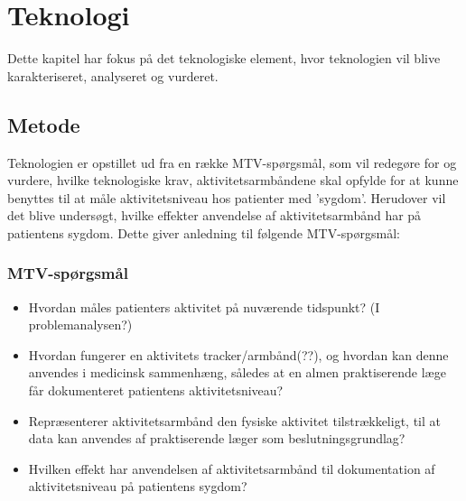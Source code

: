 \chapter{Teknologi}
Dette kapitel har fokus på det teknologiske element, hvor teknologien vil blive karakteriseret, analyseret og vurderet.
\section{Metode}
Teknologien er opstillet ud fra en række MTV-spørgsmål, som vil redegøre for og vurdere, hvilke teknologiske krav, aktivitetsarmbåndene skal opfylde for at kunne benyttes til at måle aktivitetsniveau hos patienter med ’sygdom’. Herudover vil det blive undersøgt, hvilke effekter anvendelse af aktivitetsarmbånd har på patientens sygdom. Dette giver anledning til følgende MTV-spørgsmål: 
\subsection{MTV-spørgsmål}
\begin{itemize}
\item Hvordan måles patienters aktivitet på nuværende tidspunkt? (I problemanalysen?)
\item Hvordan fungerer en aktivitets tracker/armbånd(??), og hvordan kan denne anvendes i medicinsk sammenhæng, således at en almen praktiserende læge får dokumenteret patientens aktivitetsniveau?
\item Repræsenterer aktivitetsarmbånd den fysiske aktivitet tilstrækkeligt, til at data kan anvendes af praktiserende læger som beslutningsgrundlag?
\item Hvilken effekt har anvendelsen af aktivitetsarmbånd til dokumentation af aktivitetsniveau på patientens sygdom?
\end{itemize}








